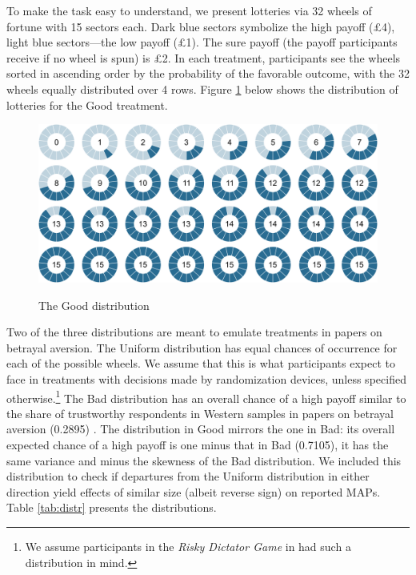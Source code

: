 \documentclass[pdftex,12pt, a4paper]{article}
\begin{document}
To make the task easy to understand, we present lotteries via 32 wheels of fortune with 15 sectors each.
Dark blue sectors symbolize the high payoff (\pounds4), light blue sectors---the low payoff (\pounds1).
The sure payoff (the payoff participants receive if no wheel is spun) is \pounds2.
In each treatment, participants see the wheels sorted in ascending order by the probability of the favorable outcome, with the 32 wheels equally distributed over 4 rows.
Figure \ref{fig:TheGood} below shows the distribution of lotteries for the Good treatment.

\begin{figure}[h!]
  \centering
 {\includegraphics[width=\linewidth]{Fig1_Left_15.pdf}}
  \caption{The Good distribution}
  \label{fig:TheGood}
\end{figure}

Two of the three distributions are meant to emulate treatments in papers on betrayal aversion.
The Uniform distribution has equal chances of occurrence for each of the possible wheels.
We assume that this is what participants expect to face in treatments with decisions made by randomization devices, unless specified otherwise.\footnote{
We assume participants in the \textit{Risky Dictator Game} in \cite{Bohnet2004} had such a distribution in mind.
}
The Bad distribution has an overall chance of a high payoff similar to the share of trustworthy respondents in Western samples in papers on betrayal aversion (0.2895) \citep[e.g. ][]{Bohnet2004,Bohnet2008}.
The distribution in Good mirrors the one in Bad: its overall expected chance of a high payoff is one minus that in Bad (0.7105), it has the same variance and minus the skewness of the Bad distribution.
We included this distribution to check if departures from the Uniform distribution in either direction yield effects of similar size (albeit reverse sign) on reported MAPs.
Table \ref{tab:distr} presents the distributions.
\end{document}
